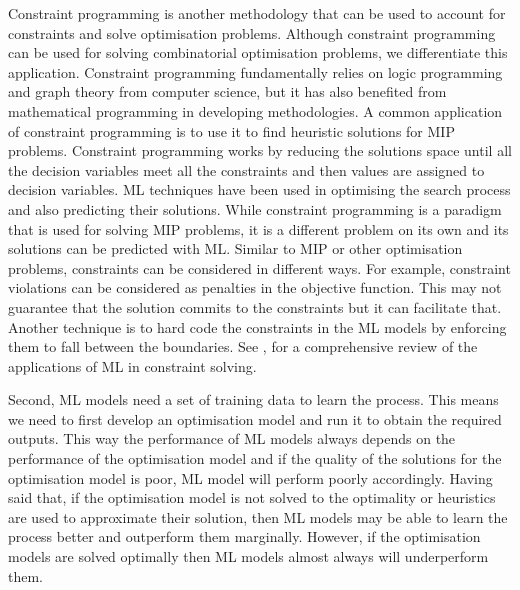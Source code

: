 \documentclass[graybox]{svmult}
\begin{document}
Constraint programming is another methodology that can be used to account for constraints and solve optimisation problems. Although constraint programming can be used for solving combinatorial optimisation problems, we differentiate this application. Constraint programming fundamentally relies on logic programming and graph theory from computer science, but it has also benefited from mathematical programming in developing methodologies. A common application of constraint programming is to use it to find heuristic solutions for MIP problems. Constraint programming works by reducing the solutions space until all the decision variables meet all the constraints and then values are assigned to decision variables. ML techniques have been used in optimising the search process and also predicting their solutions. While constraint programming is a paradigm that is used for solving MIP problems, it is a different problem on its own and its solutions can be predicted with ML. Similar to MIP or other optimisation problems, constraints can be considered in different ways. For example, constraint violations can be considered as penalties in the objective function. This may not guarantee that the solution commits to the constraints but it can facilitate that. Another technique is to hard code the constraints in the ML models by enforcing them to fall between the boundaries. See \cite{Popescu2022-tk}, for a comprehensive review of the applications of ML in constraint solving. 


Second, ML models need a set of training data to learn the process. This means we need to first develop an optimisation model and run it to obtain the required outputs. This way the performance of ML models always depends on the performance of the optimisation model and if the quality of the solutions for the optimisation model is poor, ML model will perform poorly accordingly. Having said that, if the optimisation model is not solved to the optimality or heuristics are used to approximate their solution, then ML models may be able to learn the process better and outperform them marginally. However, if the optimisation models are solved optimally then ML models almost always will underperform them.
\end{document}
